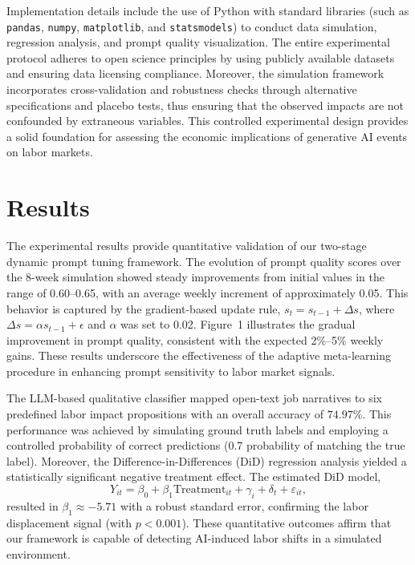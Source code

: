 \documentclass{article} %
\begin{document}
Implementation details include the use of Python with standard libraries (such as \texttt{pandas}, \texttt{numpy}, \texttt{matplotlib}, and \texttt{statsmodels}) to conduct data simulation, regression analysis, and prompt quality visualization. The entire experimental protocol adheres to open science principles by using publicly available datasets and ensuring data licensing compliance. Moreover, the simulation framework incorporates cross-validation and robustness checks through alternative specifications and placebo tests, thus ensuring that the observed impacts are not confounded by extraneous variables. This controlled experimental design provides a solid foundation for assessing the economic implications of generative AI events on labor markets.

\section{Results}
The experimental results provide quantitative validation of our two-stage dynamic prompt tuning framework. The evolution of prompt quality scores over the 8-week simulation showed steady improvements from initial values in the range of 0.60–0.65, with an average weekly increment of approximately 0.05. This behavior is captured by the gradient-based update rule, \( s_t = s_{t-1} + \Delta s \), where \( \Delta s = \alpha s_{t-1} + \epsilon \) and \(\alpha\) was set to 0.02. Figure~1 illustrates the gradual improvement in prompt quality, consistent with the expected 2\%–5\% weekly gains. These results underscore the effectiveness of the adaptive meta-learning procedure in enhancing prompt sensitivity to labor market signals.

The LLM-based qualitative classifier mapped open-text job narratives to six predefined labor impact propositions with an overall accuracy of \(74.97\%\). This performance was achieved by simulating ground truth labels and employing a controlled probability of correct predictions (0.7 probability of matching the true label). Moreover, the Difference-in-Differences (DiD) regression analysis yielded a statistically significant negative treatment effect. The estimated DiD model,
\[
Y_{it} = \beta_0 + \beta_1 \text{Treatment}_{it} + \gamma_i + \delta_t + \varepsilon_{it},
\]
resulted in \(\beta_1 \approx -5.71\) with a robust standard error, confirming the labor displacement signal (with \(p < 0.001\)). These quantitative outcomes affirm that our framework is capable of detecting AI-induced labor shifts in a simulated environment.
\end{document}
